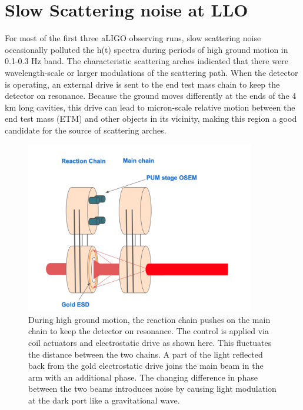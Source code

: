 \documentclass[12pt]{iopart}
\begin{document}
\section{Slow Scattering noise at LLO}\label{m0r0_scattering}
For most of the first three aLIGO observing runs, slow scattering noise occasionally polluted the h(t) spectra during periods of high ground motion in 0.1-0.3 Hz band. The characteristic scattering arches indicated that there were wavelength-scale or larger modulations of the scattering path. When the detector is operating, an external drive is sent to the end test mass chain to keep the detector on resonance. Because the ground moves differently at the ends of the 4 km long cavities, this drive can lead to micron-scale relative motion between the end test mass (ETM) and other objects in its vicinity, making this region a good candidate for the source of scattering arches.

\begin{figure}[h]
    \centering
    \includegraphics[width=10cm]{mirror-diagram1.eps}
    \caption{During high ground motion, the reaction chain pushes on the main chain  to keep the detector on resonance. The control is applied via coil actuators and electrostatic drive as shown here. This fluctuates the distance between the two chains. A part of the light reflected back from the gold electrostatic drive joins the main beam in the arm with an additional phase. The changing difference in phase between the two beams introduces noise by causing light modulation at the dark port like a gravitational wave.}
    \label{fig:mirror_diag}
\end{figure}
\end{document}
